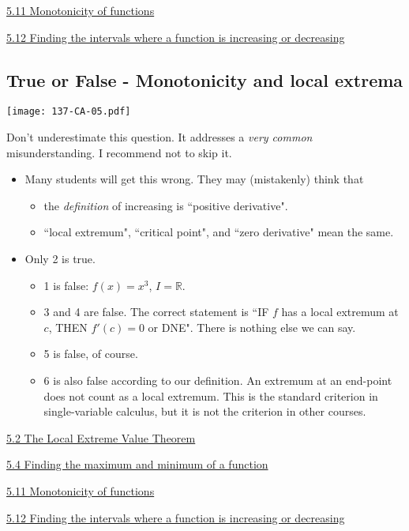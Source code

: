 \documentclass[11pt]{article}
\newcommand{\R}{\mathbb{R}}
\newcommand{\nl}{\hfill \vspace{-1.1\baselineskip}} %
\newcommand{\vii}{\hspace{8mm} \href{https://www.youtube.com/watch?v=_z8OglXFIq8&list=PLlwePzQY_wW9m5oabUf6hvfVfAaA9uAwM&index=2}{5.2 The Local Extreme Value Theorem}}
\newcommand{\viv}{\hspace{8mm} \href{https://www.youtube.com/watch?v=_giwkVIFeGY&list=PLlwePzQY_wW9m5oabUf6hvfVfAaA9uAwM&index=4}{5.4 Finding the maximum and minimum of a function}}
\newcommand{\vxi}{\hspace{8mm} \href{https://www.youtube.com/watch?v=HlzVrFcqi04&list=PLlwePzQY_wW9m5oabUf6hvfVfAaA9uAwM&index=11}{5.11 Monotonicity of functions}}
\newcommand{\vxii}{\hspace{8mm} \href{https://www.youtube.com/watch?v=HsMHLIwKmFo&list=PLlwePzQY_wW9m5oabUf6hvfVfAaA9uAwM&index=12}{5.12 Finding the intervals where a function is increasing or decreasing}}
\begin{document}
\begin{videos}
\vxi

\vxii
\end{videos}

\newpage
\subsection{True or False - Monotonicity and local extrema}

\begin{center}
{ \texttt{[image: 137-CA-05.pdf]}} 
\end{center}

\begin{warning}
Don't underestimate this question.  It addresses a \emph{very common} misunderstanding.  I recommend not to skip it.
\end{warning}
\begin{comments}
\nl
\begin{itemize}
\item Many students will get this wrong.  They may (mistakenly) think that
	\begin{itemize}
		\item the \emph{definition} of increasing is ``positive derivative".
		\item  ``local extremum", ``critical point", and ``zero derivative" mean the same. 
	\end{itemize}
\item  Only 2 is true.
	\begin{itemize}
		\item 1 is false: $f(x)=x^3$, $I = \R$.  
		\item 3 and 4 are false.  The correct statement is ``IF $f$ has a local extremum at $c$, THEN $f'(c)=0$ or DNE".  There is nothing else we can say.
		\item 5 is false, of course.
		\item 6 is also false according to our definition.  An extremum at an end-point does not count as a local extremum.  This is the standard criterion in single-variable calculus, but it is not the criterion in other courses.  
	\end{itemize}
\end{itemize}	
\end{comments}

\begin{videos}
\vii

\viv

\vxi

\vxii
\end{videos}
\end{document}
